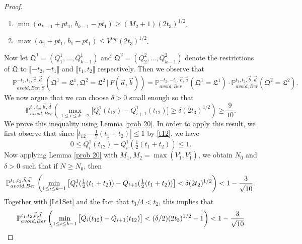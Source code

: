 \begin{proof}
\begin{enumerate}[label = (\arabic*)]
		\item $\min(a_{k-1} + pt_1,\, b_{k-1} - pt_1) \geq (M_2+1)(2t_3)^{1/2}$,
		
		\item $\max(a_1 + pt_1,\, b_1 - pt_1) \leq V^{top}(2t_3)^{1/2}$.
		
	\end{enumerate}
	Now let $\mathfrak{Q}^1 = (Q^1_1,\dots,Q^1_{k-1})$ and $\mathfrak{Q}^2 = (Q^2_2,\dots,Q^2_{k-1})$ denote the restrictions of $\mathfrak{Q}$ to $\llbracket -t_2,-t_1\rrbracket$ and $\llbracket t_1,t_2\rrbracket$ respectively. Then we observe that
	\begin{equation}\label{6.2step3ind}
	\begin{split}
	&\mathbb{P}^{-t_2,t_2,\vec{c},\vec{d}}_{avoid, Ber; \tilde S}\left(\mathfrak{Q}^1 = \mathfrak{L}^1, \mathfrak{Q}^2 = \mathfrak{L}^2\,\big|\,F(\vec{a},\vec{b})\right) = \mathbb{P}^{-t_2,-t_1,\vec{c},\vec{a}}_{avoid, Ber}\left(\mathfrak{Q}^1 = \mathfrak{L}^1\right) \cdot \mathbb{P}^{t_1,t_2,\vec{b},\vec{d}}_{avoid, Ber}\left(\mathfrak{Q}^2 = \mathfrak{L}^2\right).
	\end{split}
	\end{equation}
	We now argue that we can choose $\delta > 0$ small enough so that
	\begin{equation}\label{6.2step3right}
	\mathbb{P}^{t_1,t_2,\vec{b},\vec{d}}_{avoid, Ber}\left(\max_{1\leq i\leq k-2} \big[Q^1_i(t_{12}) - Q^1_{i+1}(t_{12})\big] \geq \delta(2t_3)^{1/2}\right) \geq \frac{9}{10}.
	\end{equation}
	We prove this inequality using Lemma \ref{prob 20}. In order to apply this result, we first observe that since $|t_{12}-\frac{1}{2}(t_1+t_2)| \leq 1$ by \eqref{t12}, we have
	\begin{equation}\label{Lt1Set}
	0 \leq Q^1_i(t_{12})-Q^1_i(\tfrac{1}{2}(t_1+t_2)) \leq 1.
	\end{equation}
	Now applying Lemma \ref{prob 20} with $M_1,M_2=\max(V_1^t,V_1^b)$, we obtain $N_0$ and $\delta>0$ such that if $N \geq N_0$, then
	\[
	\mathbb{P}^{t_1,t_2,\vec b, \vec d}_{avoid,Ber}\left(\min_{1\leq i\leq k-1} \big[Q^1_i(\tfrac{1}{2}(t_1+t_2))-Q_{i+1}(\tfrac{1}{2}(t_1+t_2))\big] < \delta(2t_2)^{1/2}\right) < 1 - \frac{3}{\sqrt{10}}.
	\]
	Together with \eqref{Lt1Set} and the fact that $t_3/4 < t_2$, this implies that
	\begin{equation}\label{step3delta/2}
	\pr^{t_1,t_2,\vec b, \vec d}_{avoid,Ber}\left(\min_{1\leq i\leq k-1} \big[Q_i(t_{12})-Q_{i+1}(t_{12})\big]<(\delta/2)(2t_3)^{1/2}-1\right) < 1 - \frac{3}{\sqrt{10}}

\end{equation}
\end{proof}
